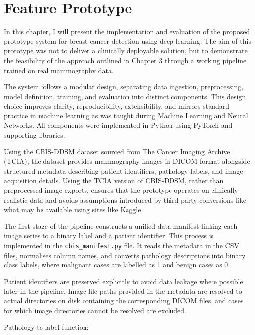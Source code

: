\section{Feature Prototype}

In this chapter, I will present the implementation and evaluation of the proposed prototype system for breast cancer detection using deep learning. The aim of this prototype was not to deliver a clinically deployable solution, but to demonstrate the feasibility of the approach outlined in Chapter 3 through a working pipeline trained on real mammography data.

The system follows a modular design, separating data ingestion, preprocessing, model definition, training, and evaluation into distinct components. This design choice improves clarity, reproducibility, extensibility, and mirrors standard practice in machine learning as was taught during Machine Learning and Neural Networks. All components were implemented in Python using PyTorch and supporting libraries.

Using the CBIS-DDSM dataset sourced from The Cancer Imaging Archive (TCIA), the dataset provides mammography images in DICOM format alongside structured metadata describing patient identifiers, pathology labels, and image acquisition details. Using the TCIA version of CBIS-DDSM, rather than preprocessed image exports, ensures that the prototype operates on clinically realistic data and avoids assumptions introduced by third-party conversions like what may be available using sites like Kaggle.

The first stage of the pipeline constructs a unified data manifest linking each image series to a binary label and a patient identifier. This process is implemented in the \texttt{cbis\_manifest.py} file. It reads the metadata in the CSV files, normalises column names, and converts pathology descriptions into binary class labels, where malignant cases are labelled as 1 and benign cases as 0. 

Patient identifiers are preserved explicitly to avoid data leakage where possible later in the pipeline. Image file paths provided in the metadata are resolved to actual directories on disk containing the corresponding DICOM files, and cases for which image directories cannot be resolved are excluded.

Pathology to label function:



